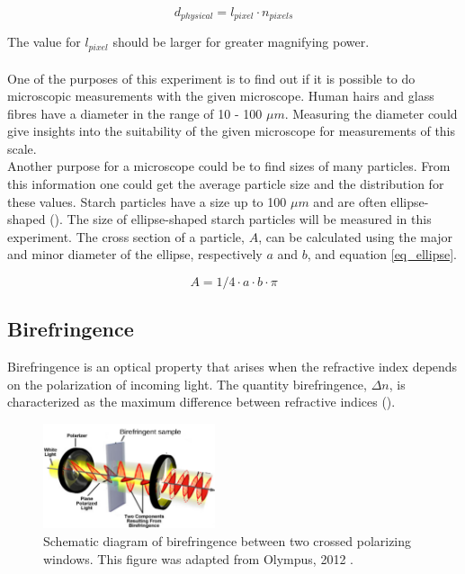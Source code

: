\begin{equation}
	\label{eq_distance}
	d_{physical} = l_{pixel} \cdot n_{pixels}
\end{equation}

The value for $l_{pixel}$ should be larger for greater magnifying power.\\
\\
One of the purposes of this experiment is to find out if it is possible to do microscopic measurements with the given microscope. Human hairs and glass fibres have a diameter in the range of 10 - 100 $\mu m$. Measuring the diameter could give insights into the suitability of the given microscope for measurements of this scale.\\
Another purpose for a microscope could be to find sizes of many particles. From this information one could get the average particle size and the distribution for these values. Starch particles have a size up to 100 $\mu m$ and are often ellipse-shaped (\cite{starch}). The size of ellipse-shaped starch particles will be measured in this experiment. The cross section of a particle, $A$, can be calculated using the major and minor diameter of the ellipse, respectively $a$ and $b$, and equation \ref{eq_ellipse}.

\begin{equation}
	\label{eq_ellipse}
	A = 1/4 \cdot a \cdot b \cdot \pi
\end{equation}
	
\subsection{Birefringence}

Birefringence is an optical property that arises when the refractive index depends on the polarization of incoming light. The quantity birefringence, $\Delta n$, is characterized as the maximum difference between refractive indices (\cite{hecht}). \\ 

\begin{figure}
	\centering
	\includegraphics[width=0.45\textwidth]{afbeeldingen/bf_principle.png}
	\caption{Schematic diagram of birefringence between two crossed polarizing windows. This figure was adapted from Olympus, 2012 \cite{olympus}.}
	\label{fig_bf_diagram}
\end{figure}

